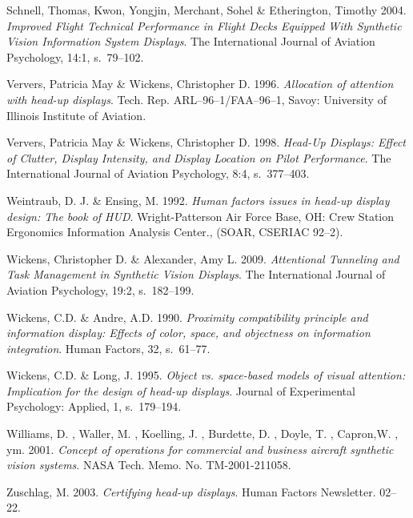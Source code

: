 \documentclass[utf8,bachelor,manualbib]{gradu3}
\begin{document}
\begin{thebibliography}{}
Schnell, Thomas,  Kwon, Yongjin, Merchant, Sohel \& Etherington, Timothy 2004.
\textit{Improved Flight Technical Performance in Flight Decks Equipped With Synthetic Vision Information System Displays}.
The International Journal of Aviation Psychology, 14:1, s.~79--102.

Ververs, Patricia May \& Wickens, Christopher D. 1996.
\textit{Allocation of attention with head-up displays}.
Tech. Rep. ARL–96–1/FAA–96–1, Savoy: University of Illinois Institute of Aviation.

Ververs, Patricia May \& Wickens, Christopher D. 1998.
\textit{Head-Up Displays: Effect of Clutter, Display Intensity, and Display Location on Pilot Performance}.
The International Journal of Aviation Psychology, 8:4, s.~377--403.

Weintraub, D. J. \& Ensing, M. 1992.
\textit{Human factors issues in head-up display design: The book of
HUD}.
Wright-Patterson Air Force Base, OH: Crew Station Ergonomics
Information Analysis Center., (SOAR, CSERIAC 92–2).

Wickens, Christopher D. \& Alexander, Amy L. 2009.
\textit{Attentional Tunneling and Task Management in Synthetic Vision Displays}.
The International Journal of Aviation Psychology, 19:2, s.~182--199.

Wickens, C.D. \& Andre, A.D. 1990.
\textit{Proximity compatibility principle and information display: Effects
of color, space, and objectness on information integration}.
Human Factors, 32, s.~61--77.

Wickens, C.D. \& Long, J. 1995.
\textit{Object vs. space-based models of visual attention: Implication for the design of head-up displays}.
Journal of Experimental Psychology: Applied, 1, s.~179--194.

Williams, D. , Waller, M. , Koelling, J. , Burdette, D. , Doyle, T. , Capron,W. , ym. 2001.
\textit{Concept of operations for commercial and business aircraft synthetic vision systems}.
NASA Tech. Memo. No. TM-2001-211058.

Zuschlag, M. 2003.
\textit{Certifying head-up displays}.
Human Factors Newsletter. 02--22.

\end{thebibliography}
\end{document}
